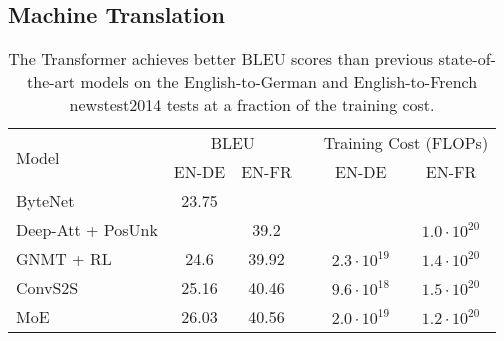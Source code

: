 \subsection{Machine Translation}
\begin{table}[t]
  \begin{center}
    \caption{The Transformer achieves better BLEU scores than previous
      state-of-the-art models on the English-to-German and English-to-French
      newstest2014 tests at a fraction of the training cost.	}
    \label{tab:wmt-results}
    \vspace{-2mm}
    \begin{tabular}{lccccc}
      \toprule
      \multirow{2}{*}{\vspace{-2mm}Model}                     & \multicolumn{2}{c}{BLEU} &                &
      \multicolumn{2}{c}{Training Cost (FLOPs)}                                                                                           \\
      \cmidrule{2-3} \cmidrule{5-6}
                                                              & EN-DE                    & EN-FR          &   & EN-DE             & EN-FR \\
      \hline
      ByteNet \citep{NalBytenet2017}                          & 23.75                    &                &   &                   &       \\
      Deep-Att + PosUnk \citep{DBLP:journals/corr/ZhouCWLX16} &                          & 39.2           &   &                   &
      $1.0\cdot10^{20}$                                                                                                                   \\
      GNMT + RL \citep{wu2016google}                          & 24.6                     & 39.92          &   & $2.3\cdot10^{19}$ &
      $1.4\cdot10^{20}$                                                                                                                   \\
      ConvS2S \citep{JonasFaceNet2017}                        & 25.16                    & 40.46          &   & $9.6\cdot10^{18}$ &
      $1.5\cdot10^{20}$                                                                                                                   \\
      MoE \citep{shazeer2017outrageously}                     & 26.03                    & 40.56          &   & $2.0\cdot10^{19}$ &
      $1.2\cdot10^{20}$                                                                                                                   \\

\end{tabular}
\end{center}
\end{table}
